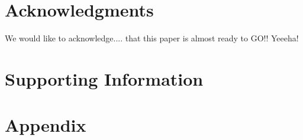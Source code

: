 \documentclass{article}
\begin{document}
\section{Acknowledgments}
We would like to acknowledge.... {\color{red} that this paper is almost ready to GO!! Yeeeha!}

\section{Supporting Information}

\section{Appendix}


\end{document}
